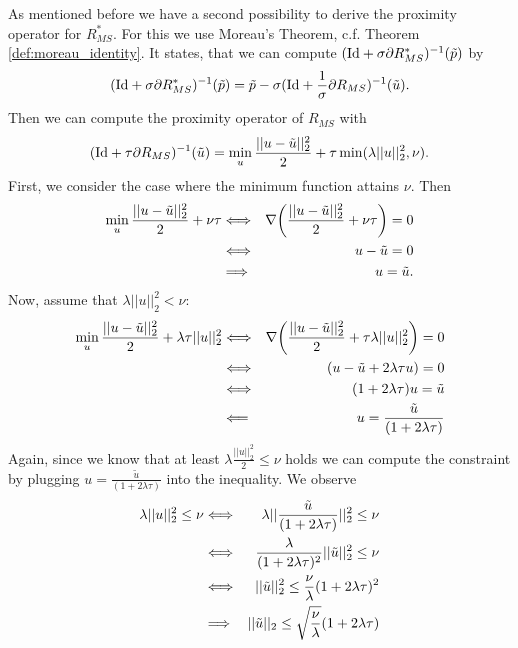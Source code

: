         As mentioned before we have a second possibility to derive the proximity operator for $R_{MS}^{\ast}$. For this we use Moreau's Theorem, c.f. Theorem \ref{def:moreau_identity}. It states, that we can compute $(\textnormal{Id} + \sigma \partial R_{MS}^{\ast})^{-1}(\tilde{p})$ by
            $$
                (\textnormal{Id} + \sigma \partial R_{MS}^{\ast})^{-1}(\tilde{p}) = \tilde{p} - \sigma (\textnormal{Id} + \frac{1}{\sigma} \partial R_{MS})^{-1}(\tilde{u}).
            $$
        Then we can compute the proximity operator of $R_{MS}$ with
            $$
                (\textnormal{Id} + \tau \partial R_{MS})^{-1}(\tilde{u}) = \min_{u} \frac{||u - \tilde{u}||_{2}^{2}}{2} + \tau \min(\lambda ||u||_{2}^{2}, \nu).
            $$
        First, we consider the case where the minimum function attains $\nu$. Then
            \begin{eqnarray}
                \min_{u} \frac{||u - \tilde{u}||_{2}^{2}}{2} + \nu\tau &\Longleftrightarrow& \nabla \bigg( \frac{||u - \tilde{u}||_{2}^{2}}{2} + \nu\tau \bigg) = 0 \notag \\
                &\Longleftrightarrow& u - \tilde{u} = 0 \notag \\
                &\Longrightarrow& u = \tilde{u}. \notag
            \end{eqnarray}
        Now, assume that $\lambda ||u||_{2}^{2} < \nu$:
            \begin{eqnarray}
                \min_{u} \frac{||u - \tilde{u}||_{2}^{2}}{2} + \lambda\tau ||u||_{2}^{2} &\Longleftrightarrow& \nabla \bigg( \frac{||u - \tilde{u}||_{2}^{2}}{2} + \tau \lambda ||u||_{2}^{2} \bigg) = 0 \notag \\
                &\Longleftrightarrow& (u - \tilde{u} + 2\lambda\tau u) = 0 \notag \\
                &\Longleftrightarrow& (1 + 2\lambda\tau) u = \tilde{u} \notag \\
                &\Longleftarrow& u = \frac{\tilde{u}}{(1 + 2\lambda\tau)} \notag
            \end{eqnarray}
        Again, since we know that at least $\lambda \frac{||u||_{2}^{2}}{2} \le \nu$ holds we can compute the constraint by plugging $u = \frac{\tilde{u}}{(1 + 2\lambda\tau)}$ into the inequality. We observe
            \begin{eqnarray}
                \lambda ||u||_{2}^{2} \le \nu &\Longleftrightarrow& \lambda ||\frac{\tilde{u}}{(1 + 2\lambda\tau)}||_{2}^{2} \le \nu \notag \\
                &\Longleftrightarrow& \frac{\lambda}{(1 + 2\lambda\tau)^{2}} ||\tilde{u}||_{2}^{2} \le \nu \notag \\
                &\Longleftrightarrow& ||\tilde{u}||_{2}^{2} \le \frac{\nu}{\lambda}(1 + 2\lambda\tau)^{2} \notag \\
                &\Longrightarrow& ||\tilde{u}||_{2} \le \sqrt{\frac{\nu}{\lambda}}(1 + 2\lambda\tau) \notag
            \end{eqnarray}
